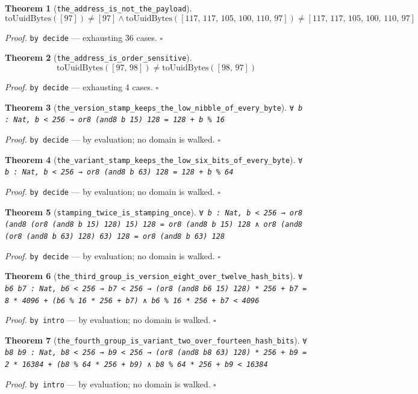 \documentclass[11pt]{article}
\newtheorem{theorem}{Theorem}[section]
\begin{document}
\begin{theorem}[\texttt{the\_address\_is\_not\_the\_payload}]
\[ \mathrm{toUuidBytes}\mathopen{}\left([97]\right) \neq [97] \land \mathrm{toUuidBytes}\mathopen{}\left([117,\,117,\,105,\,100,\,110,\,97]\right) \neq [117,\,117,\,105,\,100,\,110,\,97] \]
\end{theorem}
\noindent\emph{Proof.} \texttt{by decide} --- exhausting 36 cases. \hfill$\square$

\begin{theorem}[\texttt{the\_address\_is\_order\_sensitive}]
\[ \mathrm{toUuidBytes}\mathopen{}\left([97,\,98]\right) \neq \mathrm{toUuidBytes}\mathopen{}\left([98,\,97]\right) \]
\end{theorem}
\noindent\emph{Proof.} \texttt{by decide} --- exhausting 4 cases. \hfill$\square$

\begin{theorem}[\texttt{the\_version\_stamp\_keeps\_the\_low\_nibble\_of\_every\_byte}]
\texttt{∀ b : Nat, b < 256 → or8 (and8 b 15) 128 = 128 + b \% 16}
\end{theorem}
\noindent\emph{Proof.} \texttt{by decide} --- by evaluation; no domain is walked. \hfill$\square$

\begin{theorem}[\texttt{the\_variant\_stamp\_keeps\_the\_low\_six\_bits\_of\_every\_byte}]
\texttt{∀ b : Nat, b < 256 → or8 (and8 b 63) 128 = 128 + b \% 64}
\end{theorem}
\noindent\emph{Proof.} \texttt{by decide} --- by evaluation; no domain is walked. \hfill$\square$

\begin{theorem}[\texttt{stamping\_twice\_is\_stamping\_once}]
\texttt{∀ b : Nat, b < 256 → or8 (and8 (or8 (and8 b 15) 128) 15) 128 = or8 (and8 b 15) 128 ∧ or8 (and8 (or8 (and8 b 63) 128) 63) 128 = or8 (and8 b 63) 128}
\end{theorem}
\noindent\emph{Proof.} \texttt{by decide} --- by evaluation; no domain is walked. \hfill$\square$

\begin{theorem}[\texttt{the\_third\_group\_is\_version\_eight\_over\_twelve\_hash\_bits}]
\texttt{∀ b6 b7 : Nat, b6 < 256 → b7 < 256 → (or8 (and8 b6 15) 128) * 256 + b7 = 8 * 4096 + (b6 \% 16 * 256 + b7) ∧ b6 \% 16 * 256 + b7 < 4096}
\end{theorem}
\noindent\emph{Proof.} \texttt{by
  intro} --- by evaluation; no domain is walked. \hfill$\square$

\begin{theorem}[\texttt{the\_fourth\_group\_is\_variant\_two\_over\_fourteen\_hash\_bits}]
\texttt{∀ b8 b9 : Nat, b8 < 256 → b9 < 256 → (or8 (and8 b8 63) 128) * 256 + b9 = 2 * 16384 + (b8 \% 64 * 256 + b9) ∧ b8 \% 64 * 256 + b9 < 16384}
\end{theorem}
\noindent\emph{Proof.} \texttt{by
  intro} --- by evaluation; no domain is walked. \hfill$\square$
\end{document}
